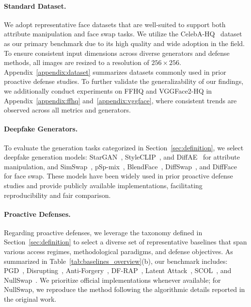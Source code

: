 \documentclass{article}
\begin{document}
\paragraph{Standard Dataset.}
We adopt representative face datasets that are well-suited to support both attribute manipulation and face swap tasks. We utilize the CelebA-HQ~\cite{karras2017progressive} dataset as our primary benchmark due to its high quality and wide adoption in the field. To ensure consistent input dimensions across diverse generators and defense methods, all images are resized to a resolution of $256 \times 256$. Appendix~\ref{appendix:dataset} summarizes datasets commonly used in prior proactive defense studies. To further validate the generalizability of our findings, we additionally conduct experiments on FFHQ and VGGFace2-HQ in Appendix~\ref{appendix:ffhq} and~\ref{appendix:vggface}, where consistent trends are observed across all metrics and generators.

\paragraph{Deepfake Generators.}
To evaluate the generation tasks categorized in Section~\ref{sec:definition}, we select deepfake generation models: StarGAN~\cite{choi2018stargan}, StyleCLIP~\cite{patashnik2021styleclip}, and DiffAE~\cite{preechakul2022diffusion} for attribute manipulation, and SimSwap~\cite{chen2020simswap}, pSp-mix~\cite{richardson2021encoding}, BlendFace~\cite{shiohara2023blendface}, DiffSwap~\cite{zhao2023diffswap}, and DiffFace~\cite{kim2025diffface} for face swap. These models have been widely used in prior proactive defense studies and provide publicly available implementations, facilitating reproducibility and fair comparison.

\paragraph{Proactive Defenses.}
Regarding proactive defenses, we leverage the taxonomy defined in Section~\ref{sec:definition} to select a diverse set of representative baselines that span various access regimes, methodological paradigms, and defense objectives. As summarized in Table~\ref{tab:baselines_overview}(b), our benchmark includes: PGD~\cite{madry2017towards}, Disrupting~\cite{ruiz2020disrupting}, Anti-Forgery~\cite{wang2022anti}, DF-RAP~\cite{qu2024df}, Latent Attack~\cite{kos2018adversarial}, SCOL~\cite{lee2025scol}, and NullSwap~\cite{wang2025nullswap}. We prioritize official implementations whenever available; for NullSwap, we reproduce the method following the algorithmic details reported in the original work. 
\end{document}
